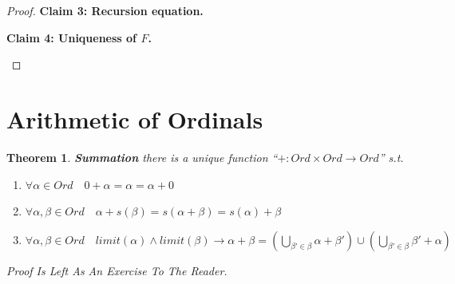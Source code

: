 \documentclass[10pt,a4paper]{book}
\newtheorem{theorem}{Theorem}[section]
\begin{document}
\begin{proof}
    \textbf{Claim 3: Recursion equation.}

    \begin{fitchproof}[arrayenv=tabular]


    \end{fitchproof}

    \textbf{Claim 4: Uniqueness of $F$.}

    \begin{fitchproof}[arrayenv=tabular]


    \end{fitchproof}

\end{proof}

\section{Arithmetic of Ordinals}

\begin{theorem}\textbf{Summation} there is a unique function ``$+ :Ord \times Ord \to Ord$'' s.t.

    \begin{enumerate}
        \setlength{\itemsep}{0pt} %
        \item       $\forall \alpha  \in Ord \quad  0 + \alpha = \alpha =  \alpha +0  $
        \item       $\forall \alpha , \beta  \in Ord \quad \alpha +s( \beta ) = s(\alpha  + \beta ) = s(\alpha) + \beta  $
        \item       $\forall \alpha , \beta  \in Ord \quad limit(\alpha) \land limit(\beta) \to \alpha + \beta = (\bigcup_{\beta' \in \beta} \alpha + \beta') \cup (\bigcup_{\beta' \in \beta} \beta' + \alpha  ) $
    \end{enumerate}
    Proof Is Left As An Exercise To The Reader.
\end{theorem}
\end{document}
